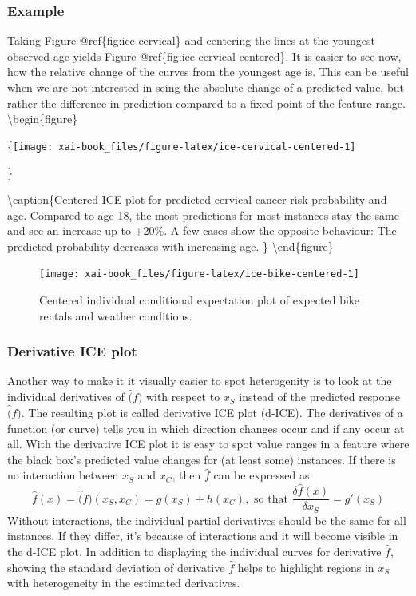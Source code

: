 \documentclass[12pt,]{krantz}
\theoremstyle{definition}
\theoremstyle{definition}
\theoremstyle{definition}
\theoremstyle{remark}
\begin{document}
\subsubsection{Example}\label{example-1}

Taking Figure @ref\{fig:ice-cervical\} and centering the lines at the
youngest observed age yields Figure @ref\{fig:ice-cervical-centered\}.
It is easier to see now, how the relative change of the curves from the
youngest age is. This can be useful when we are not interested in seing
the absolute change of a predicted value, but rather the difference in
prediction compared to a fixed point of the feature range.
\textbackslash{}begin\{figure\}

\{\centering \texttt{[image: xai-book\_files/figure-latex/ice-cervical-centered-1]}

\}

\textbackslash{}caption\{Centered ICE plot for predicted cervical cancer
risk probability and age. Compared to age 18, the most predictions for
most instances stay the same and see an increase up to +20\%. A few
cases show the opposite behaviour: The predicted probability decreases
with increasing age. \}\label{fig:ice-cervical-centered}
\textbackslash{}end\{figure\}

\begin{figure}

{\centering \texttt{[image: xai-book\_files/figure-latex/ice-bike-centered-1]} 

}

\caption{Centered individual conditional expectation plot of expected bike rentals and weather conditions.}\label{fig:ice-bike-centered}
\end{figure}

\subsubsection{Derivative ICE plot}\label{derivative-ice-plot}

Another way to make it it visually easier to spot heterogenity is to
look at the individual derivatives of \(\hat(f)\) with respect to
\(x_S\) instead of the predicted response \(\hat(f)\). The resulting
plot is called derivative ICE plot (d-ICE). The derivatives of a
function (or curve) tells you in which direction changes occur and if
any occur at all. With the derivative ICE plot it is easy to spot value
ranges in a feature where the black box's predicted value changes for
(at least some) instances. If there is no interaction between \(x_S\)
and \(x_C\), then \(\hat{f}\) can be expressed as:
\[\hat{f}(x) = \hat(f)(x_S, x_C) = g(x_S) + h(x_C), \text{ so that } \frac{\delta\hat{f}(x)}{\delta x_S} = g'(x_S)\]
Without interactions, the individual partial derivatives should be the
same for all instances. If they differ, it's because of interactions and
it will become visible in the d-ICE plot. In addition to displaying the
individual curves for derivative \(\hat{f}\), showing the standard
deviation of derivative \(\hat{f}\) helps to highlight regions in
\(x_S\) with heterogeneity in the estimated derivatives.
\end{document}
